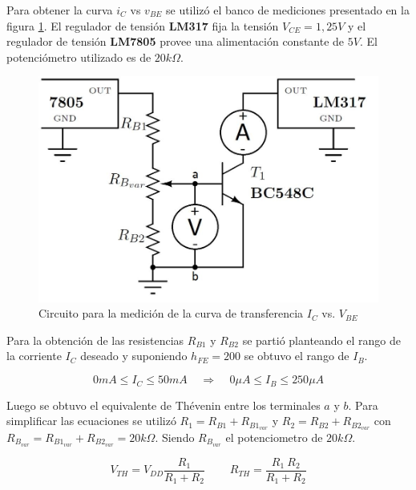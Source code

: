 \documentclass[10pt,spanish,a4paper,openany,notitlepage]{article}
\begin{document}
Para obtener la curva $i_C$ vs $v_{BE}$ se utilizó el banco de mediciones presentado en la figura \ref{circuito:medicion_transferencia}. El regulador de tensión \textbf{LM317} fija la tensión $V_{CE}=1,25\unit{V}$ y el regulador de tensión \textbf{LM7805} provee una alimentación constante de $5\unit{V}$. El potenciómetro utilizado es de $20 \unit{k\Omega}$.

\begin{figure}[H] %
\begin{center}
\includegraphics[scale=0.3]{./imagenes/ic_vbe.jpg}
\caption{Circuito para la medición de la curva de transferencia $I_C$ vs. $V_{BE}$}
 \label{circuito:medicion_transferencia}
\end{center}
\end{figure}

Para la obtención de las resistencias $R_{B1}$ y $R_{B2}$ se partió planteando el rango de la corriente $I_C$ deseado y suponiendo $h_{FE} = 200$ se obtuvo el rango de $I_B$.

\[ \displaystyle 0 \unit{mA} \leq I_C \leq 50\unit{mA} \ \ \ \ \ \Longrightarrow \ \ \ \ \  0 \unit{\mu A} \leq I_B \leq 250 \unit{\mu A} \]

Luego se obtuvo el equivalente de Thévenin entre los terminales $a$ y $b$. Para simplificar las ecuaciones se utilizó $R_1 = R_{B1} + R_{B1_{var}}$ y $R_2 = R_{B2} + R_{B2_{var}}$ con $R_{B_{var}} = R_{B1_{var}} + R_{B2_{var}} = 20 \unit{k\Omega}$. Siendo $R_{B_{var}}$ el potenciometro de $20 \unit{k\Omega}$.

\[ \displaystyle V_{TH} = V_{DD} \frac{R_1}{R_1 + R_2}\ \ \ \ \ \ \ \ \ \ R_{TH} = \frac{R_1\ R_2}{R_1 + R_2}\]
\end{document}
